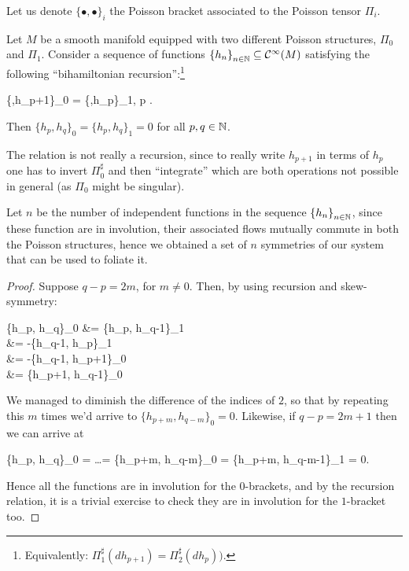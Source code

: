 \documentclass[main.tex]{subfiles}
\begin{document}
Let us denote $\{\bullet,\bullet\}_i$ the Poisson bracket associated to the Poisson tensor $\Pi_i$.

\begin{theorem}
\label{th:magri}
	Let $M$ be a smooth manifold equipped with two different Poisson structures, $\Pi_0$ and $\Pi_1$. Consider a sequence of functions $\left\{h_{n}\right\}_{n \in \mathbb{N}} \subseteq \mathcal{C}^\infty(M)$ satisfying the following ``bihamiltonian recursion'':\footnote{Equivalently: $\Pi_1^\sharp (dh_{p+1}) = \Pi_2^\sharp(dh_p))$.}
	\begin{eqalign}
		\{\bullet,h_{p+1}\}_0 = \{\bullet,h_p\}_1, \quad \forall p \in \N.
	\end{eqalign}
	Then $\{h_p,h_q\}_0 = \{h_p,h_q\}_1 = 0$ for all $p,q \in \mathbb{N}$.
\end{theorem}
\begin{remark}
	The relation is not really a recursion, since to really write $h_{p+1}$ in terms of $h_p$ one has to invert $\Pi_0^\sharp$ and then ``integrate'' which are both operations not possible in general (as $\Pi_0$ might be singular).
\end{remark}
\begin{remark}
	Let $n$ be the number of independent functions in the sequence $\left\{h_{n}\right\}_{n \in \mathbb{N}}$, since these function are in involution, their associated flows mutually commute in both the Poisson structures, hence we obtained a set of $n$ symmetries of our system that can be used to foliate it.
\end{remark}
\begin{proof}
	Suppose $q-p=2m$, for $m \neq 0$. Then, by using recursion and skew-symmetry:
	\begin{eqalign}
		\{h_p, h_q\}_0 &= \{h_p, h_{q-1}\}_1\\
		&= -\{h_{q-1}, h_p\}_1\\
		&= -\{h_{q-1}, h_{p+1}\}_0\\
		&= \{h_{p+1}, h_{q-1}\}_0
	\end{eqalign}
	We managed to diminish the difference of the indices of $2$, so that by repeating this $m$ times we'd arrive to $\{h_{p+m}, h_{q-m}\}_0 =0$. Likewise, if $q-p = 2m+1$ then we can arrive at
	\begin{eqalign}
		\{h_p, h_q\}_0 = \ldots = \{h_{p+m}, h_{q-m}\}_0 = \{h_{p+m}, h_{q-m-1}\}_1 = 0.
	\end{eqalign}
	Hence all the functions are in involution for the $0$-brackets, and by the recursion relation, it is a trivial exercise to check they are in involution for the $1$-bracket too.
\end{proof}
\end{document}
